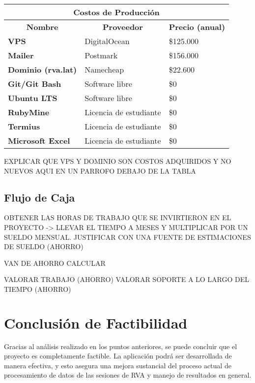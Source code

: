 \begin{center}
	\begin{tabular}{ | l | p{5cm} | p{5cm}|}
		\hline
		\multicolumn{3}{|c|}{\textbf{Costos de Producción}} \\
		\hline
		\multicolumn{1}{|c|}{\textbf{Nombre}} & \multicolumn{1}{|c|}{\textbf{Proveedor}} & \multicolumn{1}{|c|}{\textbf{Precio (anual)}} \\
		\hline
		{\textbf{VPS}} & DigitalOcean & \$125.000 \\ \hline
		
		{\textbf{Mailer}} & Postmark & \$156.000 \\ \hline
		
		{\textbf{Dominio (rva.lat)}} & Namecheap & \$22.600 \\ \hline
		
		{\textbf{Git/Git Bash}} & Software libre & \$0 \\ \hline
		
		{\textbf{Ubuntu LTS}} & Software libre & \$0 \\ \hline
		
		{\textbf{RubyMine}} & Licencia de estudiante & \$0 \\ \hline
		
		{\textbf{Termius}} & Licencia de estudiante & \$0 \\ \hline
		
		{\textbf{Microsoft Excel}} & Licencia de estudiante & \$0 \\ \hline
	\end{tabular}
\end{center}

EXPLICAR QUE VPS Y DOMINIO SON COSTOS ADQUIRIDOS Y NO NUEVOS AQUI EN UN PARROFO DEBAJO DE LA TABLA

\subsection{Flujo de Caja}

OBTENER LAS HORAS DE TRABAJO QUE SE INVIRTIERON EN EL PROYECTO -> LLEVAR EL TIEMPO A MESES Y MULTIPLICAR POR UN SUELDO MENSUAL. JUSTIFICAR CON UNA FUENTE DE ESTIMACIONES DE SUELDO (AHORRO)

VAN DE AHORRO CALCULAR

VALORAR TRABAJO (AHORRO)
VALORAR SOPORTE A LO LARGO DEL TIEMPO (AHORRO)

\section{Conclusión de Factibilidad}
Gracias al análisis realizado en los puntos anteriores, se puede concluir que el proyecto es completamente factible. La aplicación podrá ser desarrollada de manera efectiva, y esto asegura una mejora sustancial del proceso actual de procesamiento de datos de las sesiones de RVA y manejo de resultados en general.
